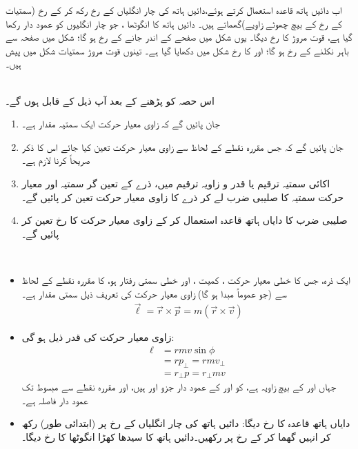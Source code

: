 اب دائیں ہاتھ قاعدہ  استعمال کرتے ہوئے،دائیں  ہاتھ کی چار انگلیاں    کے رخ    رکھ کر      کے رخ  (سمتیات کے رخ کے بیچ چھوٹے زاویے)گھماتے ہیں۔ دائیں ہاتھ کا انگوٹھا   ، جو چار انگلیوں کو عمود دار رکھا گیا ہے، قوت مروڑ کا رخ دیگا۔ یوں    شکل  میں  صفحے کے اندر   جانے  کے رخ   ہو گا؛    شکل  میں صفحہ سے باہر نکلنے کے رخ ہو گا؛ اور    کا رخ شکل   میں دکھایا گیا ہے۔ تینوں قوت مروڑ سمتیات شکل  میں پیش ہیں۔
 
 
 \\
 اس حصہ کو پڑھنے کے بعد آپ ذیل کے قابل ہوں گے۔
 \begin{enumerate}[1.]
 \item
 جان پائیں گے کہ زاوی معیار حرکت ایک سمتیہ مقدار ہے۔
 \item
 جان پائیں گے کہ جس مقررہ نقطے کے لحاظ سے زاوی معیار حرکت   تعین کیا جائے اس  کا   ذکر صریحاً  کرنا   لازم ہے۔
 \item
 اکائی سمتیہ ترقیم  یا قدر و زاویہ ترقیم میں، ذرے کے تعین گر سمتیہ اور  معیار حرکت سمتیہ کا صلیبی ضرب لے کر ذرے کا زاوی معیار حرکت تعین کر پائیں گے۔
 \item
 صلیبی ضرب کا دایاں ہاتھ قاعدہ استعمال کر کے زاوی معیار حرکت کا رخ تعین کر پائیں گے۔
 \end{enumerate}
 
 \\
 \begin{itemize}
 \item
  ایک ذرہ، جس کا خطی معیار حرکت  ، کمیت ، اور خطی سمتی رفتار  ہو، کا مقررہ نقطے کے لحاظ سے (جو عموماً مبدا ہو گا)  زاوی معیار حرکت  کی تعریف ذیل سمتی  مقدار ہے۔
  \begin{align*}
  \vec{\ell}=\vec{r}\times \vec{p}=m(\vec{r}\times \vec{v})
  \end{align*}
  \item
  زاوی معیار حرکت    کی قدر  ذیل ہو گی:
  \begin{align*}
  \ell&=rmv\sin\phi\\
  &=rp_{\perp}=rmv_{\perp}\\
  &=r_{\perp}p=r_{\perp}mv
  \end{align*}
  جہاں  اور  کے بیچ زاویہ  ہے،  کو  اور  کے عمود دار
   جزو  اور  ہیں، اور مقررہ نقطے سے مبسوط    تک عمود دار فاصلہ  ہے۔
   \item
   دایاں ہاتھ قاعدہ  کا رخ دیگا: دائیں ہاتھ کی چار انگلیاں  کے رخ پر (ابتدائی طور)   رکھ کر  انہیں گھما کر   کے رخ    پر  رکھیں۔دائیں ہاتھ کا سیدھا کھڑا انگوٹھا  کا رخ دیگا۔
 \end{itemize}
 
